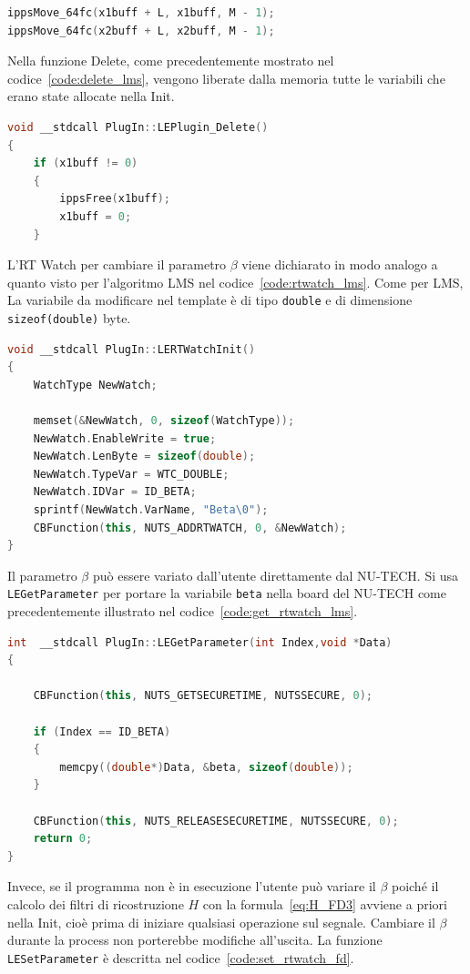 \documentclass[12pt,a4paper,titlepage]{article}
\begin{document}
\begin{lstlisting}[language=cpp, label=code:aggiornamento_buffer_ingresso, caption = Aggiornamento dei buffer di ingresso, breaklines = false, captionpos = b]
ippsMove_64fc(x1buff + L, x1buff, M - 1);
ippsMove_64fc(x2buff + L, x2buff, M - 1);
\end{lstlisting}
Nella funzione Delete, come precedentemente mostrato nel codice~\ref{code:delete_lms}, vengono liberate dalla memoria tutte le variabili che erano state allocate nella Init.
\begin{lstlisting}[language=cpp, label=code:delete_fd, caption = Funzione \texttt{LEPlugin\_Delete}, breaklines = false, captionpos = b]
void __stdcall PlugIn::LEPlugin_Delete()
{
	if (x1buff != 0)
	{
		ippsFree(x1buff);
		x1buff = 0;
	}
\end{lstlisting}

L'RT Watch per cambiare il parametro $\beta$ viene dichiarato in modo analogo a quanto visto per l'algoritmo LMS nel codice~\ref{code:rtwatch_lms}. Come per LMS, La variabile da modificare nel template è di tipo \texttt{double} e di dimensione \texttt{sizeof(double)} byte.

\begin{lstlisting}[language=cpp, label=code:rtwatch_fd, caption = Creazione RT Watch, breaklines = false, captionpos = b]
void __stdcall PlugIn::LERTWatchInit()
{
	WatchType NewWatch;

	memset(&NewWatch, 0, sizeof(WatchType));
	NewWatch.EnableWrite = true;
	NewWatch.LenByte = sizeof(double);
	NewWatch.TypeVar = WTC_DOUBLE;
	NewWatch.IDVar = ID_BETA;
	sprintf(NewWatch.VarName, "Beta\0");
	CBFunction(this, NUTS_ADDRTWATCH, 0, &NewWatch);
}
\end{lstlisting}
Il parametro $\beta$ può essere variato dall'utente direttamente dal NU-TECH. Si usa \texttt{LEGetParameter} per portare la variabile \texttt{beta} nella board del NU-TECH come precedentemente illustrato nel codice~\ref{code:get_rtwatch_lms}.

\begin{lstlisting}[language=cpp, label=code:get_rtwatch_fd, caption = Funzione \texttt{LEGetParameter}, breaklines = false, captionpos = b]
int  __stdcall PlugIn::LEGetParameter(int Index,void *Data)
{

	CBFunction(this, NUTS_GETSECURETIME, NUTSSECURE, 0);

	if (Index == ID_BETA)
	{
		memcpy((double*)Data, &beta, sizeof(double));
	}

	CBFunction(this, NUTS_RELEASESECURETIME, NUTSSECURE, 0);
	return 0;
}
\end{lstlisting}
Invece, se il programma non è in esecuzione l'utente può variare il $\beta$ poiché il calcolo dei filtri di ricostruzione $H$ con la formula~\eqref{eq:H_FD3} avviene a priori nella Init, cioè prima di iniziare qualsiasi operazione sul segnale. Cambiare il $\beta$ durante la process non porterebbe modifiche all'uscita. La funzione \texttt{LESetParameter} è descritta nel codice~\ref{code:set_rtwatch_fd}.
\end{document}
